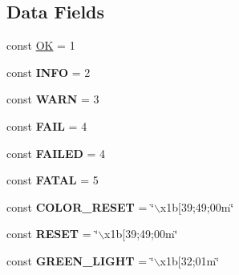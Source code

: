 \subsection*{\-Data \-Fields}
\begin{DoxyCompactItemize}
\item 
const \hyperlink{class_tools_1_1_log_c_l_i_a662f51c007afab9ac309d177745a503f}{\-O\-K} = 1
\item 
\hypertarget{class_tools_1_1_log_c_l_i_af2d1bd27ecbe33ecaadb558404e9c669}{
const {\bfseries \-I\-N\-F\-O} = 2}
\label{class_tools_1_1_log_c_l_i_af2d1bd27ecbe33ecaadb558404e9c669}

\item 
\hypertarget{class_tools_1_1_log_c_l_i_abd1339a4c3a81762b7990ed8f2205566}{
const {\bfseries \-W\-A\-R\-N} = 3}
\label{class_tools_1_1_log_c_l_i_abd1339a4c3a81762b7990ed8f2205566}

\item 
\hypertarget{class_tools_1_1_log_c_l_i_af51bf014241fcd1e8447fe833514b928}{
const {\bfseries \-F\-A\-I\-L} = 4}
\label{class_tools_1_1_log_c_l_i_af51bf014241fcd1e8447fe833514b928}

\item 
\hypertarget{class_tools_1_1_log_c_l_i_a748e0de2b5ac66732062f3992cfe154b}{
const {\bfseries \-F\-A\-I\-L\-E\-D} = 4}
\label{class_tools_1_1_log_c_l_i_a748e0de2b5ac66732062f3992cfe154b}

\item 
\hypertarget{class_tools_1_1_log_c_l_i_a5681855cc2c6bb5393c853e165b8c8ee}{
const {\bfseries \-F\-A\-T\-A\-L} = 5}
\label{class_tools_1_1_log_c_l_i_a5681855cc2c6bb5393c853e165b8c8ee}

\item 
\hypertarget{class_tools_1_1_log_c_l_i_aa65ef8e0301e12421f57c353b8bfbe82}{
const {\bfseries \-C\-O\-L\-O\-R\-\_\-\-R\-E\-S\-E\-T} = \char`\"{}$\backslash$x1b\mbox{[}39;49;00m\char`\"{}}
\label{class_tools_1_1_log_c_l_i_aa65ef8e0301e12421f57c353b8bfbe82}

\item 
\hypertarget{class_tools_1_1_log_c_l_i_a469ee33c689dc4ae8973e28506e8f9bc}{
const {\bfseries \-R\-E\-S\-E\-T} = \char`\"{}$\backslash$x1b\mbox{[}39;49;00m\char`\"{}}
\label{class_tools_1_1_log_c_l_i_a469ee33c689dc4ae8973e28506e8f9bc}

\item 
\hypertarget{class_tools_1_1_log_c_l_i_af5d2689b3eeacabb6ad413552ef9b4c0}{
const {\bfseries \-G\-R\-E\-E\-N\-\_\-\-L\-I\-G\-H\-T} = \char`\"{}$\backslash$x1b\mbox{[}32;01m\char`\"{}}
\label{class_tools_1_1_log_c_l_i_af5d2689b3eeacabb6ad413552ef9b4c0}


\end{DoxyCompactItemize}

